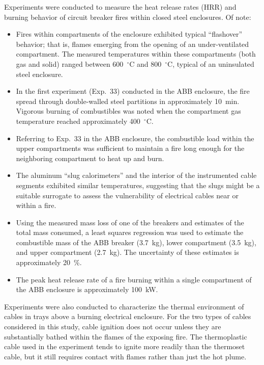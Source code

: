 Experiments were conducted to measure the heat release rates (HRR) and burning behavior of circuit breaker fires within closed steel enclosures. Of note:
\begin{itemize}
\item Fires within compartments of the enclosure exhibited typical ``flashover'' behavior; that is, flames emerging from the opening of an under-ventilated compartment. The measured temperatures within these compartments (both gas and solid) ranged between 600~$^\circ$C and 800~$^\circ$C, typical of an uninsulated steel enclosure.
\item In the first experiment (Exp.~33) conducted in the ABB enclosure, the fire spread through double-walled steel partitions in approximately 10~min. Vigorous burning of combustibles was noted when the compartment gas temperature reached approximately 400~$^\circ$C.
\item Referring to Exp.~33 in the ABB enclosure, the combustible load within the upper compartments was sufficient to maintain a fire long enough for the neighboring compartment to heat up and burn.
\item The aluminum ``slug calorimeters'' and the interior of the instrumented cable segments exhibited similar temperatures, suggesting that the slugs might be a suitable surrogate to assess the vulnerability of electrical cables near or within a fire.
\item Using the measured mass loss of one of the breakers and estimates of the total mass consumed, a least squares regression was used to estimate the combustible mass of the ABB breaker (3.7~kg), lower compartment (3.5~kg), and upper compartment (2.7~kg). The uncertainty of these estimates is approximately 20~\%.
\item The peak heat release rate of a fire burning within a single compartment of the ABB enclosure is approximately 100~kW.
\end{itemize}


Experiments were also conducted to characterize the thermal environment of cables in trays above a burning electrical enclosure. For the two types of cables considered in this study, cable ignition does not occur unless they are substantially bathed within the flames of the exposing fire. The thermoplastic cable used in the experiment tends to ignite more readily than the thermoset cable, but it still requires contact with flames rather than just the hot plume.


\newpage

